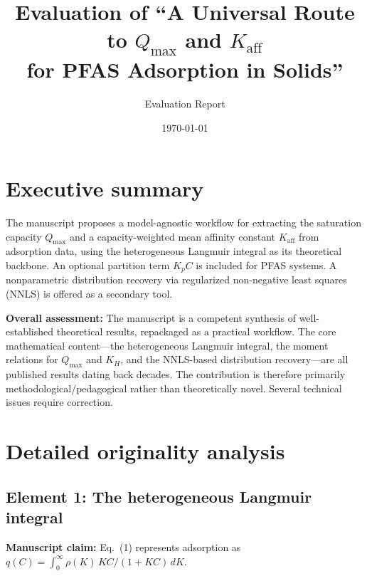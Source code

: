 \documentclass[12pt]{article}
\begin{document}
\title{Evaluation of ``A Universal Route to $Q_{\max}$ and $K_{\mathrm{aff}}$\\
for PFAS Adsorption in Solids''}
\author{Evaluation Report}
\date{\today}
\maketitle

\section{Executive summary}

The manuscript proposes a model-agnostic workflow for extracting the
saturation capacity $Q_{\max}$ and a capacity-weighted mean affinity
constant $K_{\mathrm{aff}}$ from adsorption data, using the heterogeneous
Langmuir integral as its theoretical backbone.  An optional partition
term $K_p C$ is included for PFAS systems.  A nonparametric distribution
recovery via regularized non-negative least squares (NNLS) is offered as
a secondary tool.

\textbf{Overall assessment:} The manuscript is a competent synthesis of
well-established theoretical results, repackaged as a practical workflow.
The core mathematical content---the heterogeneous Langmuir integral, the
moment relations for $Q_{\max}$ and $K_H$, and the NNLS-based
distribution recovery---are all published results dating back decades.
The contribution is therefore primarily methodological/pedagogical rather
than theoretically novel.  Several technical issues require correction.

\section{Detailed originality analysis}

\subsection{Element 1: The heterogeneous Langmuir integral}

\textbf{Manuscript claim:} Eq.~(1) represents adsorption as
$q(C)=\int_0^\infty \rho(K)\,KC/(1+KC)\,dK$.
\end{document}
